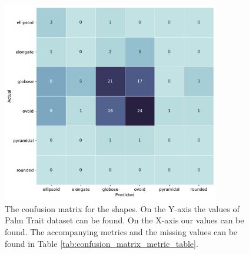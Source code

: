 \documentclass[a4paper, 12pt, oneside]{book} %
\begin{document}
\begin{figure}[htpb]
    \centering
    \includegraphics[width=0.85\textwidth]{figures/confusion_matrix_shapes.pdf}
    \caption[Confusion matrix shapes]{The confusion matrix for the shapes. On the Y-axis the values of Palm Trait dataset can be found. On the X-axis our values can be found. The accompanying metrics and the missing values can be found in Table \ref{tab:confusion_matrix_metric_table}.}
    \label{fig:confusion_matrix_shapes}
\end{figure}
\end{document}
